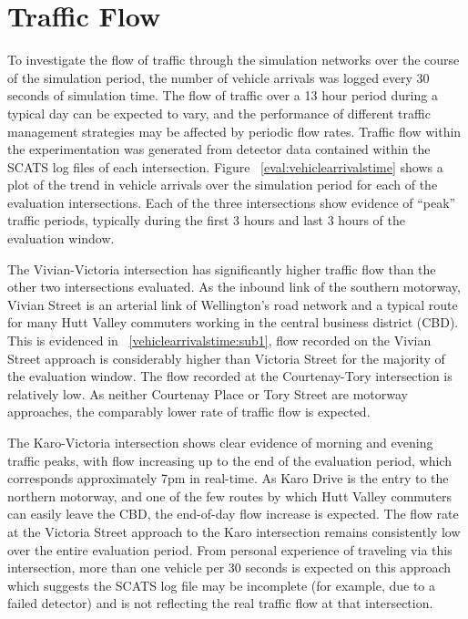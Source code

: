 {\section{Traffic Flow}
\label{sec:trafficflow}

To investigate the flow of traffic through the simulation networks over the course of the simulation period, the number of vehicle arrivals was logged every 30 seconds of simulation time. The flow of traffic over a 13 hour period during a typical day can be expected to vary, and the performance of different traffic management strategies may be affected by periodic flow rates. Traffic flow within the experimentation was generated from detector data contained within the SCATS log files of each intersection. Figure ~\ref{eval:vehiclearrivalstime} shows a plot of the trend in vehicle arrivals over the simulation period for each of the evaluation intersections. Each of the three intersections show evidence of ``peak'' traffic periods, typically during the first 3 hours and last 3 hours of the evaluation window.

The Vivian-Victoria intersection has significantly higher traffic flow than the other two intersections evaluated. As the inbound link of the southern motorway, Vivian Street is an arterial link of Wellington's road network and a typical route for many Hutt Valley commuters working in the central business district (CBD). This is evidenced in ~\ref{vehiclearrivalstime:sub1}, flow recorded on the Vivian Street approach is considerably higher than Victoria Street for the majority of the evaluation window. The flow recorded at the Courtenay-Tory intersection is relatively low. As neither Courtenay Place or Tory Street are motorway approaches, the comparably lower rate of traffic flow is expected. 

The Karo-Victoria intersection shows clear evidence of morning and evening traffic peaks, with flow increasing up to the end of the evaluation period, which corresponds approximately 7pm in real-time. As Karo Drive is the entry to the northern motorway, and one of the few routes by which Hutt Valley commuters can easily leave the CBD, the end-of-day flow increase is expected. The flow rate at the Victoria Street approach to the Karo intersection remains consistently low over the entire evaluation period. From personal experience of traveling via this intersection, more than one vehicle per 30 seconds is expected on this approach which suggests the SCATS log file may be incomplete (for example, due to a failed detector) and is not reflecting the real traffic flow at that intersection. 

}
